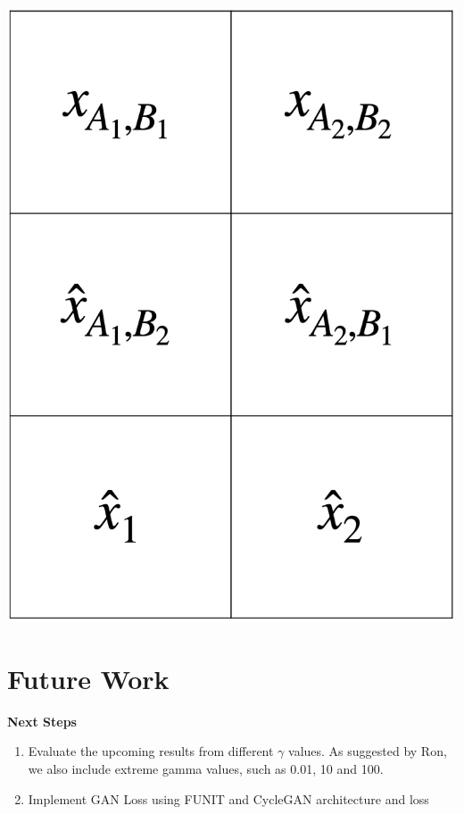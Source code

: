 \documentclass{article}
\newenvironment{Figure}
  {\par\medskip\noindent\minipage{\linewidth}}
  {\endminipage\par\medskip}
\begin{document}
\begin{multicols}{2}
\begin{Figure}
	\centering 
	\includegraphics[width=0.7\linewidth]{figures/layout.png}
	\label{fig:layout}
\end{Figure}

\section{Future Work}
\textbf{Next Steps}
\begin{enumerate}
	\item Evaluate the upcoming results from different $\gamma$ values. As suggested by Ron, we also include extreme gamma values, such as 0.01, 10 and 100.
	\item Implement GAN Loss using FUNIT and CycleGAN architecture and loss
\end{enumerate}


\end{multicols}
\end{document}
